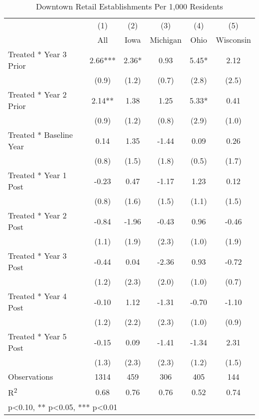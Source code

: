 \begin{table}[htbp]\centering
\def\sym#1{\ifmmode^{#1}\else\(^{#1}\)\fi}
\caption{Downtown Retail Establishments Per 1,000 Residents}
\begin{tabular}{l*{5}{c}}
\toprule
            &\multicolumn{1}{c}{(1)}   &\multicolumn{1}{c}{(2)}   &\multicolumn{1}{c}{(3)}   &\multicolumn{1}{c}{(4)}   &\multicolumn{1}{c}{(5)}   \\
            &         All   &        Iowa   &    Michigan   &        Ohio   &   Wisconsin   \\
\midrule
Treated * Year 3 Prior&        2.66***&        2.36*  &        0.93   &        5.45*  &        2.12   \\
            &       (0.9)   &       (1.2)   &       (0.7)   &       (2.8)   &       (2.5)   \\
Treated * Year 2 Prior&        2.14** &        1.38   &        1.25   &        5.33*  &        0.41   \\
            &       (0.9)   &       (1.2)   &       (0.8)   &       (2.9)   &       (1.0)   \\
Treated * Baseline Year&        0.14   &        1.35   &       -1.44   &        0.09   &        0.26   \\
            &       (0.8)   &       (1.5)   &       (1.8)   &       (0.5)   &       (1.7)   \\
Treated * Year 1 Post&       -0.23   &        0.47   &       -1.17   &        1.23   &        0.12   \\
            &       (0.8)   &       (1.6)   &       (1.5)   &       (1.1)   &       (1.5)   \\
Treated * Year 2 Post&       -0.84   &       -1.96   &       -0.43   &        0.96   &       -0.46   \\
            &       (1.1)   &       (1.9)   &       (2.3)   &       (1.0)   &       (1.9)   \\
Treated * Year 3 Post&       -0.44   &        0.04   &       -2.36   &        0.93   &       -0.72   \\
            &       (1.2)   &       (2.3)   &       (2.0)   &       (1.0)   &       (0.7)   \\
Treated * Year 4 Post&       -0.10   &        1.12   &       -1.31   &       -0.70   &       -1.10   \\
            &       (1.2)   &       (2.2)   &       (2.3)   &       (1.0)   &       (0.9)   \\
Treated * Year 5 Post&       -0.15   &        0.09   &       -1.41   &       -1.34   &        2.31   \\
            &       (1.3)   &       (2.3)   &       (2.3)   &       (1.2)   &       (1.5)   \\
\midrule
Observations &        1314   &         459   &         306   &         405   &         144   \\
R\textsuperscript{2} &        0.68   &        0.76   &        0.76   &        0.52   &        0.74   \\
\bottomrule
\multicolumn{6}{l}{\footnotesize * p<0.10, ** p<0.05, *** p<0.01}\\
\end{tabular}
\end{table}
